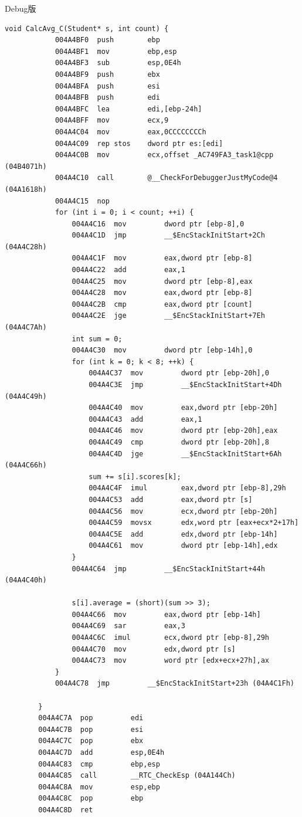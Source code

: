 \documentclass[supercite]{Experimental_Report}
\theoremstyle{definition}
\begin{document}
	Debug版
	\begin{lstlisting}[style=commonCodeStyle, caption={debug.asm}, label={lst:2-2}]
		void CalcAvg_C(Student* s, int count) {
			004A4BF0  push        ebp  
			004A4BF1  mov         ebp,esp  
			004A4BF3  sub         esp,0E4h  
			004A4BF9  push        ebx  
			004A4BFA  push        esi  
			004A4BFB  push        edi  
			004A4BFC  lea         edi,[ebp-24h]  
			004A4BFF  mov         ecx,9  
			004A4C04  mov         eax,0CCCCCCCCh  
			004A4C09  rep stos    dword ptr es:[edi]  
			004A4C0B  mov         ecx,offset _AC749FA3_task1@cpp (04B4071h)  
			004A4C10  call        @__CheckForDebuggerJustMyCode@4 (04A1618h)  
			004A4C15  nop  
			for (int i = 0; i < count; ++i) {
				004A4C16  mov         dword ptr [ebp-8],0  
				004A4C1D  jmp         __$EncStackInitStart+2Ch (04A4C28h)  
				004A4C1F  mov         eax,dword ptr [ebp-8]  
				004A4C22  add         eax,1  
				004A4C25  mov         dword ptr [ebp-8],eax  
				004A4C28  mov         eax,dword ptr [ebp-8]  
				004A4C2B  cmp         eax,dword ptr [count]  
				004A4C2E  jge         __$EncStackInitStart+7Eh (04A4C7Ah)  
				int sum = 0;
				004A4C30  mov         dword ptr [ebp-14h],0  
				for (int k = 0; k < 8; ++k) {
					004A4C37  mov         dword ptr [ebp-20h],0  
					004A4C3E  jmp         __$EncStackInitStart+4Dh (04A4C49h)  
					004A4C40  mov         eax,dword ptr [ebp-20h]  
					004A4C43  add         eax,1  
					004A4C46  mov         dword ptr [ebp-20h],eax  
					004A4C49  cmp         dword ptr [ebp-20h],8  
					004A4C4D  jge         __$EncStackInitStart+6Ah (04A4C66h)  
					sum += s[i].scores[k];
					004A4C4F  imul        eax,dword ptr [ebp-8],29h  
					004A4C53  add         eax,dword ptr [s]  
					004A4C56  mov         ecx,dword ptr [ebp-20h]  
					004A4C59  movsx       edx,word ptr [eax+ecx*2+17h]  
					004A4C5E  add         edx,dword ptr [ebp-14h]  
					004A4C61  mov         dword ptr [ebp-14h],edx  
				}
				004A4C64  jmp         __$EncStackInitStart+44h (04A4C40h)  
				
				s[i].average = (short)(sum >> 3);
				004A4C66  mov         eax,dword ptr [ebp-14h]  
				004A4C69  sar         eax,3  
				004A4C6C  imul        ecx,dword ptr [ebp-8],29h  
				004A4C70  mov         edx,dword ptr [s]  
				004A4C73  mov         word ptr [edx+ecx+27h],ax  
			}
			004A4C78  jmp         __$EncStackInitStart+23h (04A4C1Fh)  
			
		}
		004A4C7A  pop         edi  
		004A4C7B  pop         esi  
		004A4C7C  pop         ebx  
		004A4C7D  add         esp,0E4h  
		004A4C83  cmp         ebp,esp  
		004A4C85  call        __RTC_CheckEsp (04A144Ch)  
		004A4C8A  mov         esp,ebp  
		004A4C8C  pop         ebp  
		004A4C8D  ret  
	\end{lstlisting}
	
\end{document}
